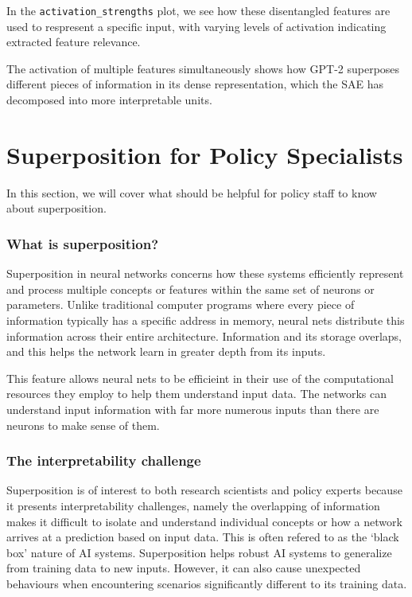 \documentclass[
  letterpaper,
  DIV=11,
  numbers=noendperiod]{scrreprt}
\begin{document}
In the \texttt{activation\_strengths} plot, we see how these
disentangled features are used to respresent a specific input, with
varying levels of activation indicating extracted feature relevance.

The activation of multiple features simultaneously shows how GPT-2
superposes different pieces of information in its dense representation,
which the SAE has decomposed into more interpretable units.\textbar{}


\chapter{Superposition for Policy
Specialists}\label{superposition-for-policy-specialists}

In this section, we will cover what should be helpful for policy staff
to know about superposition.

\subsection{What is superposition?}\label{what-is-superposition}

Superposition in neural networks concerns how these systems efficiently
represent and process multiple concepts or features within the same set
of neurons or parameters. Unlike traditional computer programs where
every piece of information typically has a specific address in memory,
neural nets distribute this information across their entire
architecture. Information and its storage overlaps, and this helps the
network learn in greater depth from its inputs.

This feature allows neural nets to be efficieint in their use of the
computational resources they employ to help them understand input data.
The networks can understand input information with far more numerous
inputs than there are neurons to make sense of them.

\subsection{The interpretability
challenge}\label{the-interpretability-challenge}

Superposition is of interest to both research scientists and policy
experts because it presents interpretability challenges, namely the
overlapping of information makes it difficult to isolate and understand
individual concepts or how a network arrives at a prediction based on
input data. This is often refered to as the `black box' nature of AI
systems. Superposition helps robust AI systems to generalize from
training data to new inputs. However, it can also cause unexpected
behaviours when encountering scenarios significantly different to its
training data.
\end{document}
